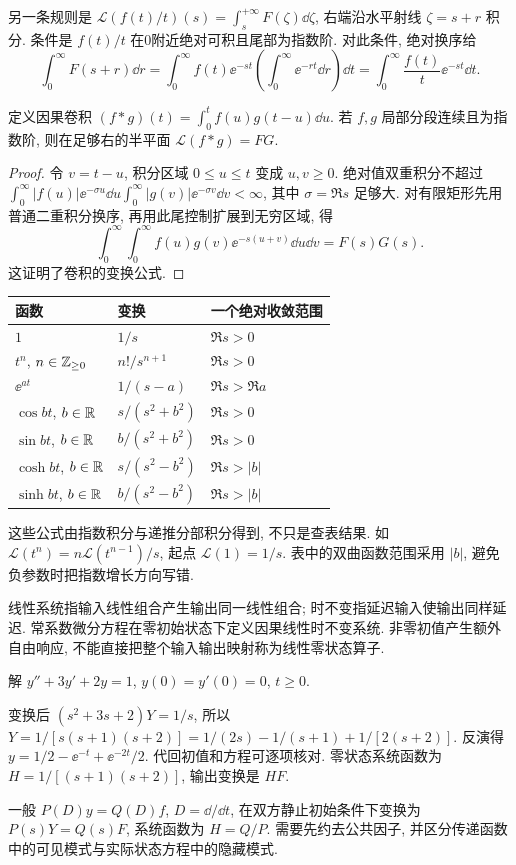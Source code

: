 另一条规则是 $\mathcal L(f(t)/t)(s)=\int_s^{+\infty}F(\zeta)\dd\zeta$, 右端沿水平射线 $\zeta=s+r$ 积分. 条件是 $f(t)/t$ 在0附近绝对可积且尾部为指数阶. 对此条件, 绝对换序给
\[
\int_0^\infty F(s+r)\dd r
 =\int_0^\infty f(t)\ee^{-st}\left(\int_0^\infty\ee^{-rt}\dd r\right)\dd t
 =\int_0^\infty\frac{f(t)}t\ee^{-st}\dd t.
\]
\begin{theorem}[卷积规则]
定义因果卷积 $(f*g)(t)=\int_0^tf(u)g(t-u)\dd u$. 若 $f,g$ 局部分段连续且为指数阶, 则在足够右的半平面 $\mathcal L(f*g)=FG$.
\end{theorem}
\begin{proof}
令 $v=t-u$, 积分区域 $0\le u\le t$ 变成 $u,v\ge0$. 绝对值双重积分不超过 $\int_0^\infty|f(u)|\ee^{-\sigma u}\dd u\int_0^\infty|g(v)|\ee^{-\sigma v}\dd v<\infty$, 其中 $\sigma=\Re s$ 足够大. 对有限矩形先用普通二重积分换序, 再用此尾控制扩展到无穷区域, 得
\[
\int_0^\infty\int_0^\infty f(u)g(v)\ee^{-s(u+v)}\dd u\dd v=F(s)G(s).
\]
这证明了卷积的变换公式.
\end{proof}
\begin{center}
\begin{tabular}{lll}
\toprule
函数 & 变换 & 一个绝对收敛范围\\
\midrule
$1$ & $1/s$ & $\Re s>0$\\
$t^n$, $n\in\mathbb Z_{\ge0}$ & $n!/s^{n+1}$ & $\Re s>0$\\
$\ee^{at}$ & $1/(s-a)$ & $\Re s>\Re a$\\
$\cos bt$, $b\in\mathbb R$ & $s/(s^2+b^2)$ & $\Re s>0$\\
$\sin bt$, $b\in\mathbb R$ & $b/(s^2+b^2)$ & $\Re s>0$\\
$\cosh bt$, $b\in\mathbb R$ & $s/(s^2-b^2)$ & $\Re s>|b|$\\
$\sinh bt$, $b\in\mathbb R$ & $b/(s^2-b^2)$ & $\Re s>|b|$\\
\bottomrule
\end{tabular}
\end{center}
这些公式由指数积分与递推分部积分得到, 不只是查表结果. 如 $\mathcal L(t^n)=n\mathcal L(t^{n-1})/s$, 起点 $\mathcal L(1)=1/s$. 表中的双曲函数范围采用 $|b|$, 避免负参数时把指数增长方向写错.

线性系统指输入线性组合产生输出同一线性组合; 时不变指延迟输入使输出同样延迟. 常系数微分方程在零初始状态下定义因果线性时不变系统. 非零初值产生额外自由响应, 不能直接把整个输入输出映射称为线性零状态算子.
\begin{example}
解 $y''+3y'+2y=1$, $y(0)=y'(0)=0$, $t\ge0$.
\end{example}
\begin{solution}
变换后 $(s^2+3s+2)Y=1/s$, 所以 $Y=1/[s(s+1)(s+2)]=1/(2s)-1/(s+1)+1/[2(s+2)]$. 反演得 $y=1/2-\ee^{-t}+\ee^{-2t}/2$. 代回初值和方程可逐项核对. 零状态系统函数为 $H=1/[(s+1)(s+2)]$, 输出变换是 $HF$.
\end{solution}
一般 $P(D)y=Q(D)f$, $D=\dd/\dd t$, 在双方静止初始条件下变换为 $P(s)Y=Q(s)F$, 系统函数为 $H=Q/P$. 需要先约去公共因子, 并区分传递函数中的可见模式与实际状态方程中的隐藏模式.

